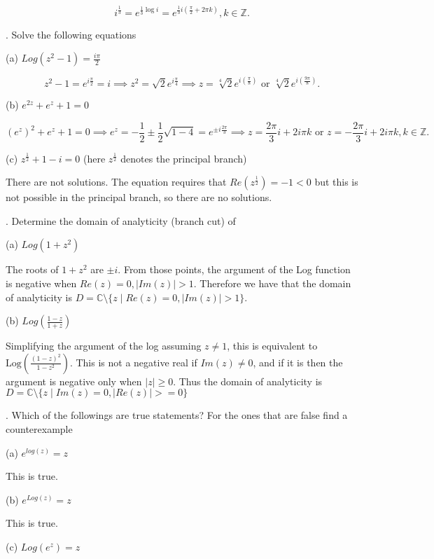 \documentclass[letterpaper, reqno,11pt]{article}
\begin{document}
\[
i^{\frac{1}{3}}=e^{\frac{1}{3}\log i}=e^{\frac{1}{3}i\left( \frac{\pi}{2}+2\pi k \right) }, k\in\mathbb{Z}
.\]

\medskip

. Solve the following equations

(a) $ Log (z^2-1)= \frac{i\pi}{2}$

\[
z^2-1=e^{i\frac{\pi}{2}}=i\implies z^2=\sqrt{2} e^{i\frac{\pi}{4}}\implies z=\sqrt[4]{2}e^{i\left( \frac{\pi}{8}\right) } \text{ or }\sqrt[4]{2}e^{i\left( \frac{9\pi}{8}\right) }
.\]

(b) $ e^{2z}+ e^z+1=0$

\[
(e^z)^2+e^z+1=0\implies e^z=-\frac{1}{2}\pm \frac{1}{2}\sqrt{1-4}=e^{\pm i\frac{2\pi}{3}}\implies z=\frac{2\pi}{3}i+2i \pi k \text{ or }z=-\frac{2\pi}{3}i+2i \pi k, k\in\mathbb{Z}
.\]

(c) $ z^{\frac{1}{2}} +1-i=0$ (here $z^{\frac{1}{2}}$ denotes the principal branch)

There are not solutions. The equation requires that $Re(z^{\frac{1}{2}})=-1<0$ but this is not possible in the principal branch, so there are no solutions. 


\medskip

. Determine the domain of analyticity (branch cut) of

(a) $ Log (1+z^2)$

The roots of $1+z^2$ are $\pm i$. From those points, the argument of the Log function is negative when $Re(z)=0, |Im(z)|>1$. Therefore we have that the domain of analyticity is  $D=\mathbb{C}\setminus\{z\mid Re(z)=0, |Im(z)| >1\} $. 

(b) $ Log (\frac{1-z}{1+z})$

Simplifying the argument of the log assuming $z\neq 1$, this is equivalent to $\text{Log}\left( \frac{(1-z)^2}{1-z^2} \right) $. This is not a negative real if $Im(z)\neq 0$, and if it is then the argument is negative only when $|z|\geq 0$. Thus the domain of analyticity is $D=\mathbb{C}\setminus\{z\mid Im(z)=0, |Re(z)| >=0\} $


\medskip

. Which of the followings are true statements? For the ones that are false find a counterexample

(a) $ e^{ log (z)} = z $

This is true. 

(b) $ e^{ Log (z)}=z$

This is true. 

(c) $ Log (e^z)=z$
\end{document}
